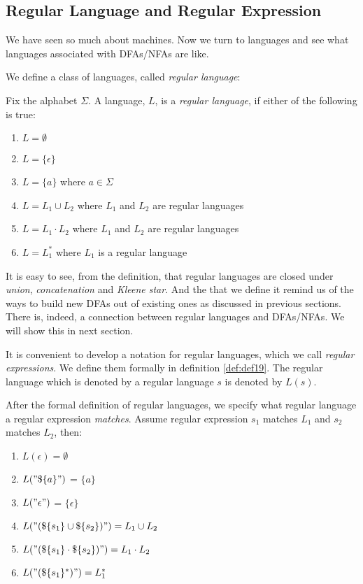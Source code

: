 \documentclass[11pt]{article}
\begin{document}
\subsection{Regular Language and Regular Expression}

We have seen so much about machines. Now we turn to languages and see what
languages associated with DFAs/NFAs are like.

We define a class of languages, called \emph{regular language}:
\begin{definition}
Fix the alphabet $\Sigma$. A language, $L$, is a \emph{regular language},
if either of the following is true:
\begin{enumerate}
\item $L = \emptyset$
\item $L = \{\epsilon\}$
\item $L = \{a\}$ where $a \in \Sigma$
\item $L = L_1 \cup L_2$ where $L_1$ and $L_2$ are regular languages
\item $L = L_1 \cdot L_2$ where $L_1$ and $L_2$ are regular languages
\item $L = L_1^\ast$ where $L_1$ is a regular language
\end{enumerate}
\end{definition}

It is easy to see, from the definition, that regular languages are closed
under \emph{union}, \emph{concatenation} and \emph{Kleene star}. And the
that we define it remind us of the ways to build new DFAs out of existing
ones as discussed in previous sections. There is, indeed, a connection
between regular languages and DFAs/NFAs. We will show this in next section.

It is convenient to develop a notation for regular languages, which we
call \emph{regular expressions}. We define them formally in definition
\ref{def:def19}. The regular language which is denoted by a regular
language $s$ is denoted by $L(s)$.

After the formal definition of regular languages, we specify what regular
language a regular expression \emph{matches}. Assume regular expression
$s_1$ matches $L_1$ and $s_2$ matches $L_2$, then:
\begin{enumerate}
\item $L(\epsilon) = \emptyset$
\item $L("\$\{a\}")$ = $\{a\}$
\item $L("\epsilon")$ = $\{\epsilon\}$
\item $L("(\$\{s_1\} \cup \$\{s_2\})") = L_1 \cup L_2$
\item $L("(\$\{s_1\} \cdot \$\{s_2\})") = L_1 \cdot L_2$
\item $L("(\$\{s_1\}^\ast)") = L_1 ^ \ast$
\end{enumerate}
\end{document}
